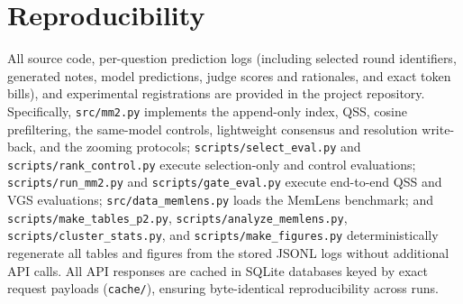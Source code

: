 \documentclass[10pt]{article}
\newcommand{\qss}{QSS}
\begin{document}
\section{Reproducibility}
\label{app:repro}

All source code, per-question prediction logs (including selected round identifiers, generated notes, model predictions, judge scores and rationales, and exact token bills), and experimental registrations are provided in the project repository. Specifically, \nolinkurl{src/mm2.py} implements the append-only index, \qss{}, cosine prefiltering, the same-model controls, lightweight consensus and resolution write-back, and the zooming protocols; \nolinkurl{scripts/select_eval.py} and \nolinkurl{scripts/rank_control.py} execute selection-only and control evaluations; \nolinkurl{scripts/run_mm2.py} and \nolinkurl{scripts/gate_eval.py} execute end-to-end \qss{} and VGS evaluations; \nolinkurl{src/data_memlens.py} loads the MemLens benchmark; and \nolinkurl{scripts/make_tables_p2.py}, \nolinkurl{scripts/analyze_memlens.py}, \nolinkurl{scripts/cluster_stats.py}, and \nolinkurl{scripts/make_figures.py} deterministically regenerate all tables and figures from the stored JSONL logs without additional API calls. All API responses are cached in SQLite databases keyed by exact request payloads (\nolinkurl{cache/}), ensuring byte-identical reproducibility across runs.
\end{document}
